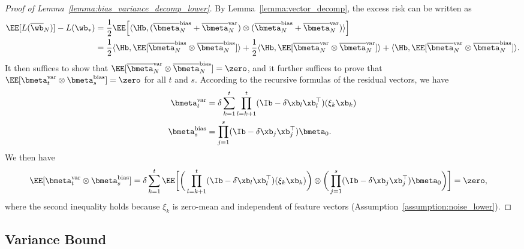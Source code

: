 \documentclass[11pt]{article}
\newcommand{\owb}{\overline{\wb}}
\newcommand{\obmeta}{\overline{\bmeta}}
\begin{document}
\begin{proof}[Proof of Lemma~\ref{lemma:bias_variance_decomp_lower}]
By Lemma~\ref{lemma:vector_decomp}, the excess risk can be written as
\begin{align*}
\EE[L(\owb_N)]-L(\wb_*)&=\frac12\EE\Big[\langle\Hb, (\obmeta_N^{\mathrm{bias}}+\obmeta_N^{\mathrm{var}})\otimes(\obmeta_N^{\mathrm{bias}}+\obmeta_N^{\mathrm{var}})\rangle\Big]\\
&=\frac12\langle\Hb, \EE[\obmeta_N^{\mathrm{bias}}\otimes\obmeta_N^{\mathrm{bias}}]\rangle+\frac12\langle\Hb, \EE[\obmeta_N^{\mathrm{var}}\otimes\obmeta_N^{\mathrm{var}}]\rangle+\langle\Hb, \EE[\obmeta_N^{\mathrm{var}}\otimes\obmeta_N^{\mathrm{bias}}]\rangle.
\end{align*}
It then suffices to show that $\EE[\obmeta_N^{\mathrm{var}}\otimes\obmeta_N^{\mathrm{bias}}]=\zero$, and it further suffices to prove that $\EE[\bmeta_t^{\mathrm{var}}\otimes\bmeta_s^{\mathrm{bias}}]=\zero$ for all $t$ and $s$. According to the recursive formulas of the residual vectors, we have
\begin{align*}
\bmeta_t^{\mathrm{var}}&=\delta\sum_{k=1}^t\prod_{l=k+1}^t(\Ib-\delta\xb_l\xb_l^\top)(\xi_k\xb_k)\\
\bmeta_s^{\mathrm{bias}}&=\prod_{j=1}^s(\Ib-\delta\xb_j\xb_j^\top)\bmeta_0.
\end{align*}
We then have
\begin{align*}
\EE[\bmeta_t^{\mathrm{var}}\otimes\bmeta_s^{\mathrm{bias}}]&=\delta\sum_{k=1}^t\EE\bigg[\bigg(\prod_{l=k+1}^t(\Ib-\delta\xb_l\xb_l^\top)(\xi_k\xb_k)\bigg)\otimes\bigg(\prod_{j=1}^s(\Ib-\delta\xb_j\xb_j^\top)\bmeta_0\bigg)\bigg]=\zero,
\end{align*}
where the second inequality holds because $\xi_k$ is zero-mean and independent of feature vectors (Assumption~\ref{assumption:noise_lower}).
\end{proof}

\subsection{Variance Bound}\label{subsection:variance}
\end{document}
